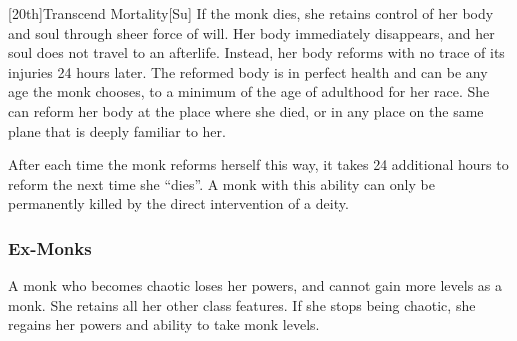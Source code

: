 [20th]{Transcend Mortality}[Su]
If the monk dies, she retains control of her body and soul through sheer force of will.
Her body immediately disappears, and her soul does not travel to an afterlife.
Instead, her body reforms with no trace of its injuries 24 hours later.
The reformed body is in perfect health and can be any age the monk chooses, to a minimum of the age of adulthood for her race.
She can reform her body at the place where she died, or in any place on the same plane that is deeply familiar to her.

After each time the monk reforms herself this way, it takes 24 additional hours to reform the next time she ``dies''.
A monk with this ability can only be permanently killed by the direct intervention of a deity.

\subsubsection{Ex-Monks}
A monk who becomes chaotic loses her \ki powers, and cannot gain more levels as a monk.
She retains all her other class features.
If she stops being chaotic, she regains her \ki powers and ability to take monk levels.

